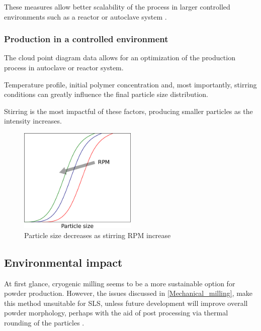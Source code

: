 \documentclass{article}
\begin{document}
    These measures allow better scalability of the process in larger controlled environments such as a reactor or autoclave system \autocite{DechetMaximilianA2020OtDo}.
    
    \subsubsection{Production in a controlled environment \label{precipitation_production_controlled_environment}}

    The cloud point diagram data allows for an optimization of the production process in autoclave or reactor system. 

    Temperature profile, initial polymer concentration and, most importantly, stirring conditions can greatly influence the final 
    particle size distribution. 
    
    Stirring is the most impactful of these factors, producing smaller particles as the intensity increases. 

    \begin{figure}[h!]
        \centering
        \includegraphics[width=0.5\textwidth]{Pictures/particle_size_stirring.eps}
        \caption{Particle size decreases as stirring RPM increase \autocites{DechetMaximilianA2020OtDo}{Inkscape}}
        \label{fig:stirring_rpm}
    \end{figure}

    \subsection{Environmental impact \label{Environmental_impact}}

    At first glance, cryogenic milling seems to be a more sustainable option for powder production. However, the issues discussed in \ref{Mechanical_milling}, 
    make this method unsuitable for SLS, unless future development will improve overall powder morphology, perhaps with the aid of 
    post processing via thermal rounding of the particles \autocite{DechetMaximilianA2020OtDo}. \\ 
    
\end{document}
